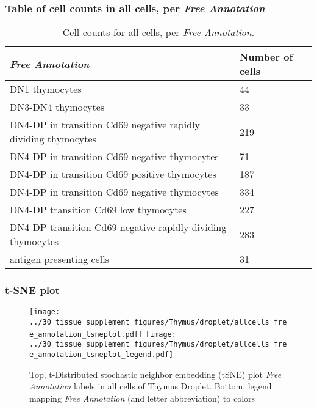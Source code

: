 \subsubsection{Table of cell counts in all cells, per \emph{Free Annotation}}\begin{table}[h]
\centering
\label{my-label}
\begin{tabular}{@{}ll@{}}
\toprule

\emph{Free Annotation}& Number of cells \\ \midrule
DN1 thymocytes & 44 \\

DN3-DN4 thymocytes & 33 \\

DN4-DP in transition Cd69 negative rapidly dividing thymocytes & 219 \\

DN4-DP in transition Cd69 negative thymocytes & 71 \\

DN4-DP in transition Cd69 positive thymocytes & 187 \\

DN4-DP in transition Cd69 negative thymocytes & 334 \\

DN4-DP transition Cd69 low thymocytes & 227 \\

DN4-DP transition Cd69 negative rapidly dividing thymocytes & 283 \\

antigen presenting cells & 31 \\
\bottomrule
\end{tabular}
\caption{Cell counts for all cells, per \emph{Free Annotation}.}
\end{table}

\clearpage
\subsubsection{t-SNE plot}
\begin{figure}[h]
\centering
\texttt{[image: ../30\_tissue\_supplement\_figures/Thymus/droplet/allcells\_free\_annotation\_tsneplot.pdf]}
\texttt{[image: ../30\_tissue\_supplement\_figures/Thymus/droplet/allcells\_free\_annotation\_tsneplot\_legend.pdf]}
\caption{Top, t-Distributed stochastic neighbor embedding (tSNE) plot  \emph{Free Annotation} labels in all cells of Thymus Droplet. Bottom, legend mapping \emph{Free Annotation} (and letter abbreviation) to colors}
\end{figure}


